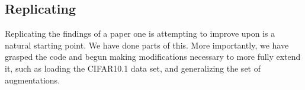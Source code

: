 \documentclass[10pt,twocolumn,letterpaper]{article}
\begin{document}

	
	

\subsection{Replicating \cite{Cubuk2018}}
	Replicating the findings of a paper one is attempting to improve upon is a natural starting point. We have done parts of this. More importantly, we have grasped the code and begun making modifications necessary to more fully extend it, such as loading the CIFAR10.1 data set, and generalizing the set of augmentations.

\end{document}
